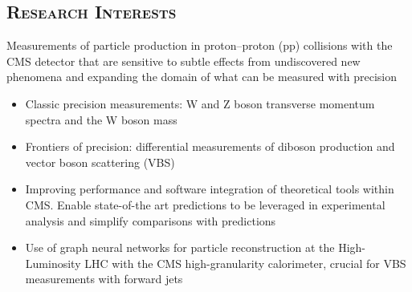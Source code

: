 \documentclass[10pt]{res} %
\begin{document}
\begin{resume}
\section{\textsc{Research Interests}}
Measurements of particle production in proton--proton (pp) collisions with the CMS detector that are sensitive 
to subtle effects from undiscovered new phenomena and expanding the domain of what can be measured with precision
\begin{itemize}
    \item Classic precision measurements: W and Z boson transverse momentum spectra and the W boson mass 
    \item Frontiers of precision: differential measurements of diboson production 
        and vector boson scattering (VBS) 
    \item Improving performance and software integration of theoretical tools within CMS.
        Enable state-of-the art predictions to be leveraged in experimental analysis and simplify comparisons with predictions
    \item Use of graph neural networks for particle reconstruction at the High-Luminosity LHC with 
    the CMS high-granularity calorimeter, crucial for VBS measurements with forward jets 
\end{itemize}


\end{resume}
\end{document}
